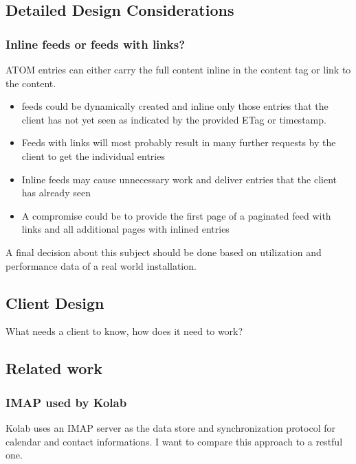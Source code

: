 \documentclass[12pt,a4paper]{scrartcl}		%
\begin{document}
\subsection{Detailed Design Considerations}
\subsubsection{Inline feeds or feeds with links?}

ATOM entries can either carry the full content inline in the content tag or link to the content.

\begin{itemize}

\item feeds could be dynamically created and inline only those entries that the client has not yet seen as indicated by the provided ETag or timestamp.
\item Feeds with links will most probably result in many further requests by the client to get the individual entries
\item Inline feeds may cause unnecessary work and deliver entries that the client has already seen
\item A compromise could be to provide the first page of a paginated feed with links and all additional pages with inlined entries
\end{itemize}

A final decision about this subject should be done based on utilization and performance data of a real world installation.

\subsection{Client Design}

What needs a client to know, how does it need to work?

\subsection{Related work}
\subsubsection{IMAP used by Kolab}

Kolab uses an IMAP server as the data store and
synchronization protocol for calendar and contact informations. I want to
compare this approach to a restful one.
\end{document}
